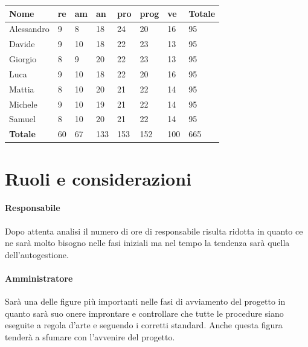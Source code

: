 \begin{center}
    \begin{tabularx}{13cm}{X |l l l l l l| X}
        \textbf{Nome}   & \textbf{re} & \textbf{am} & \textbf{an} & \textbf{pro} & \textbf{prog} & \textbf{ve} & \textbf{Totale} \\
        \hline
        Alessandro      & 9           & 8           & 18          & 24           & 20            & 16          & 95              \\
        Davide          & 9           & 10          & 18          & 22           & 23            & 13          & 95              \\
        Giorgio         & 8           & 9           & 20          & 22           & 23            & 13          & 95              \\
        Luca            & 9           & 10          & 18          & 22           & 20            & 16          & 95              \\
        Mattia          & 8           & 10          & 20          & 21           & 22            & 14          & 95              \\
        Michele         & 9           & 10          & 19          & 21           & 22            & 14          & 95              \\
        Samuel          & 8           & 10          & 20          & 21           & 22            & 14          & 95              \\
        \hline
        \textbf{Totale} & 60          & 67          & 133         & 153          & 152           & 100         & 665
    \end{tabularx}
\end{center}

\section{Ruoli e considerazioni}

\paragraph{Responsabile} Dopo attenta analisi il numero di ore di responsabile risulta ridotta in quanto ce ne sarà molto bisogno nelle fasi iniziali ma nel tempo la tendenza sarà quella dell'autogestione.

\paragraph{Amministratore} Sarà una delle figure più importanti nelle fasi di avviamento del progetto in quanto sarà suo onere improntare e controllare che tutte le procedure siano eseguite a regola d'arte e seguendo i corretti standard. Anche questa figura tenderà a sfumare con l'avvenire del progetto.


